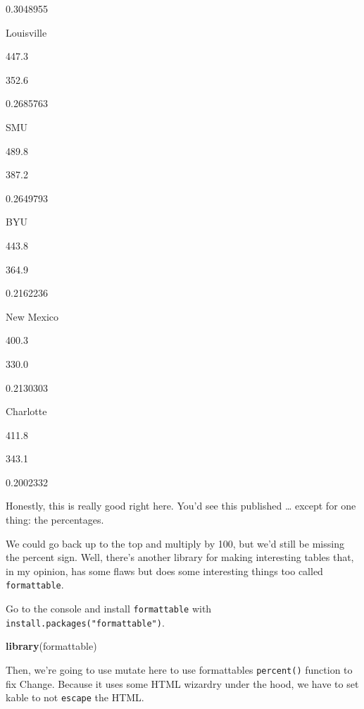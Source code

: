 \documentclass[]{book}
\newenvironment{Shaded}{\begin{snugshade}}{\end{snugshade}}
\newcommand{\DataTypeTok}[1]{\textcolor[rgb]{0.13,0.29,0.53}{#1}}
\newcommand{\DecValTok}[1]{\textcolor[rgb]{0.00,0.00,0.81}{#1}}
\newcommand{\KeywordTok}[1]{\textcolor[rgb]{0.13,0.29,0.53}{\textbf{#1}}}
\newcommand{\NormalTok}[1]{#1}
\newcommand{\OperatorTok}[1]{\textcolor[rgb]{0.81,0.36,0.00}{\textbf{#1}}}
\newcommand{\StringTok}[1]{\textcolor[rgb]{0.31,0.60,0.02}{#1}}
\begin{document}
0.3048955

Louisville

447.3

352.6

0.2685763

SMU

489.8

387.2

0.2649793

BYU

443.8

364.9

0.2162236

New Mexico

400.3

330.0

0.2130303

Charlotte

411.8

343.1

0.2002332

Honestly, this is really good right here. You'd see this published \ldots{} except for one thing: the percentages.

We could go back up to the top and multiply by 100, but we'd still be missing the percent sign. Well, there's another library for making interesting tables that, in my opinion, has some flaws but does some interesting things too called \texttt{formattable}.

Go to the console and install \texttt{formattable} with \texttt{install.packages("formattable")}.

\begin{Shaded}
\begin{Highlighting}[]
\KeywordTok{library}\NormalTok{(formattable)}
\end{Highlighting}
\end{Shaded}

Then, we're going to use mutate here to use formattables \texttt{percent()} function to fix Change. Because it uses some HTML wizardry under the hood, we have to set kable to not \texttt{escape} the HTML.

\begin{Shaded}
\end{Shaded}
\end{document}
